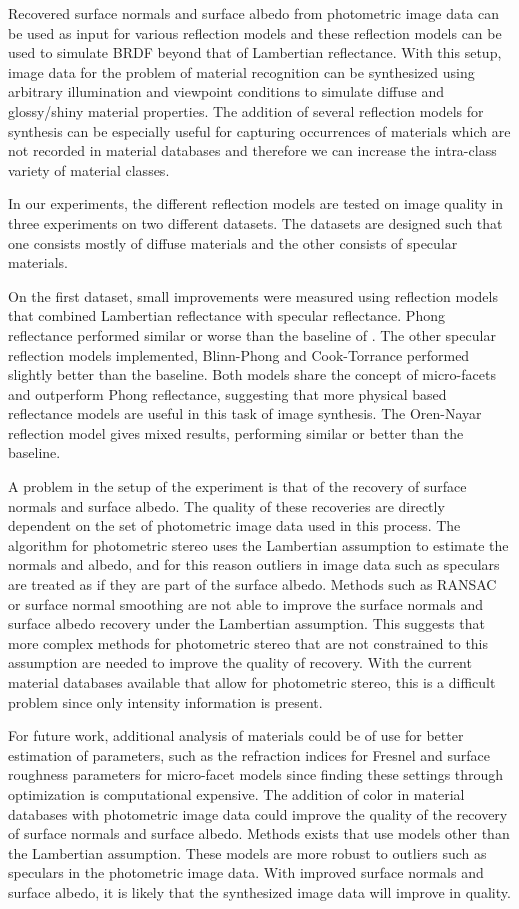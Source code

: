 Recovered surface normals and surface albedo from photometric image data can be used as input for various reflection models and these reflection models can be used to simulate BRDF beyond that of Lambertian reflectance. With this setup, image data for the problem of material recognition can be synthesized using arbitrary illumination and viewpoint conditions to simulate diffuse and glossy/shiny material properties. The addition of several reflection models for synthesis can be especially useful for capturing occurrences of materials which are not recorded in material databases and therefore we can increase the intra-class variety of material classes.

In our experiments, the different reflection models are tested on image quality in three experiments on two different datasets. The datasets are designed such that one consists mostly of diffuse materials and the other consists of specular materials. 

On the first dataset, small improvements were measured using reflection models that combined Lambertian reflectance with specular reflectance. Phong reflectance performed similar or worse than the baseline of \cite{Targhi}. The other specular reflection models implemented, Blinn-Phong and Cook-Torrance performed slightly better than the baseline. Both models share the concept of micro-facets and outperform Phong reflectance, suggesting that more physical based reflectance models are useful in this task of image synthesis. The Oren-Nayar reflection model gives mixed results, performing similar or better than the baseline. 


A problem in the setup of the experiment is that of the recovery of surface normals and surface albedo. The quality of these recoveries are directly dependent on the set of photometric image data used in this process. The algorithm for photometric stereo uses the Lambertian assumption to estimate the normals and albedo, and for this reason outliers in image data such as speculars are treated as if they are part of the surface albedo. Methods such as RANSAC or surface normal smoothing are not able to improve the surface normals and surface albedo recovery under the Lambertian assumption. This suggests that more complex methods for photometric stereo that are not constrained to this assumption are needed to improve the quality of recovery. With the current material databases available that allow for photometric stereo, this is a difficult problem since only intensity information is present. 

For future work, additional analysis of materials could be of use for better estimation of parameters, such as the refraction indices for Fresnel and surface roughness parameters for micro-facet models since finding these settings through optimization is computational expensive. The addition of color in material databases with photometric image data could improve the quality of the recovery of surface normals and surface albedo. Methods exists that use models other than the Lambertian assumption. These models are more robust to outliers such as speculars in the photometric image data. With improved surface normals and surface albedo, it is likely that the synthesized image data will improve in quality.
